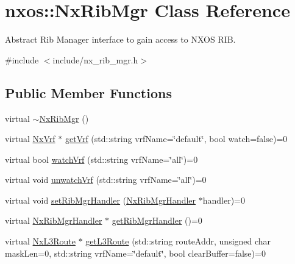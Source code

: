 \hypertarget{classnxos_1_1_nx_rib_mgr}{}\section{nxos\+:\+:Nx\+Rib\+Mgr Class Reference}
\label{classnxos_1_1_nx_rib_mgr}


Abstract Rib Manager interface to gain access to N\+X\+OS R\+IB.  




{\ttfamily \#include $<$include/nx\+\_\+rib\+\_\+mgr.\+h$>$}

\subsection*{Public Member Functions}
\begin{DoxyCompactItemize}
\item 
virtual \mbox{\hyperlink{classnxos_1_1_nx_rib_mgr_a5f390bcc244b9f5984d35290aea0e2cc}{$\sim$\+Nx\+Rib\+Mgr}} ()
\item 
virtual \mbox{\hyperlink{classnxos_1_1_nx_vrf}{Nx\+Vrf}} $\ast$ \mbox{\hyperlink{classnxos_1_1_nx_rib_mgr_a605323f1d764bc8c27fe770a9a6b4628}{get\+Vrf}} (std\+::string vrf\+Name=\char`\"{}default\char`\"{}, bool watch=false)=0
\item 
virtual bool \mbox{\hyperlink{classnxos_1_1_nx_rib_mgr_a35e2a52be337d47cd111803f64aca904}{watch\+Vrf}} (std\+::string vrf\+Name=\char`\"{}all\char`\"{})=0
\item 
virtual void \mbox{\hyperlink{classnxos_1_1_nx_rib_mgr_a957da78022cd4af95ee27941d0b67ce0}{unwatch\+Vrf}} (std\+::string vrf\+Name=\char`\"{}all\char`\"{})=0
\item 
virtual void \mbox{\hyperlink{classnxos_1_1_nx_rib_mgr_ac42dd29e34f9c508614733dbec518b99}{set\+Rib\+Mgr\+Handler}} (\mbox{\hyperlink{classnxos_1_1_nx_rib_mgr_handler}{Nx\+Rib\+Mgr\+Handler}} $\ast$handler)=0
\item 
virtual \mbox{\hyperlink{classnxos_1_1_nx_rib_mgr_handler}{Nx\+Rib\+Mgr\+Handler}} $\ast$ \mbox{\hyperlink{classnxos_1_1_nx_rib_mgr_aeed917ba912782303662c4009f3fcfcd}{get\+Rib\+Mgr\+Handler}} ()=0
\item 
virtual \mbox{\hyperlink{classnxos_1_1_nx_l3_route}{Nx\+L3\+Route}} $\ast$ \mbox{\hyperlink{classnxos_1_1_nx_rib_mgr_ae84cf1b9546fc3bf70e12bc7209ca190}{get\+L3\+Route}} (std\+::string route\+Addr, unsigned char mask\+Len=0, std\+::string vrf\+Name=\char`\"{}default\char`\"{}, bool clear\+Buffer=false)=0
\item 

\end{DoxyCompactItemize}
